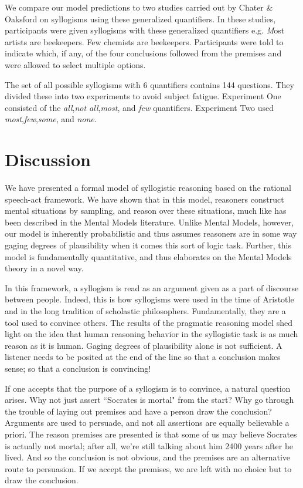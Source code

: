 \documentclass[10pt,letterpaper]{article}
\begin{document}
We compare our model predictions to two studies carried out by Chater \& Oaksford on syllogisms using these generalized quantifiers. In these studies, participants were given syllogisms with these generalized quantifiers e.g. {\emph Most artists are beekeepers. Few chemists are beekeepers.} Participants were told to indicate which, if any, of the four conclusions followed from the premises and were allowed to select multiple options.

The set of all possible syllogisms with 6 quantifiers contains 144 questions.  They divided these into two experiments to avoid subject fatigue. Experiment One consisted of the \emph{all},\emph{not all},\emph{most}, and \emph{few} quantifiers. Experiment Two used \emph{most},\emph{few},\emph{some}, and \emph{none}.

\section{Discussion}

We have presented a formal model of syllogistic reasoning based on the rational speech-act framework. We have shown that in this model, reasoners construct mental situations by sampling, and reason over these situations, much like has been described in the Mental Models literature. Unlike Mental Models, however, our model is inherently probabilistic and thus assumes reasoners are in some way gaging degrees of plausibility when it comes this sort of logic task. Further, this model is fundamentally quantitative, and thus elaborates on the Mental Models theory in a novel way.

In this framework, a syllogism is read as an argument given as a part of discourse between people. Indeed, this is how syllogisms were used in the time of Aristotle and in the long tradition of scholastic philosophers. Fundamentally, they are a tool used to convince others. The results of the pragmatic reasoning model shed light on the idea that human reasoning behavior in the syllogistic task is as much reason as it is human. Gaging degrees of plausibility alone is not sufficient. A listener needs to be posited at the end of the line so that a conclusion makes sense; so that a conclusion is convincing!

If one accepts that the purpose of a syllogism is to convince, a natural question arises. Why not just assert ``Socrates is mortal" from the start? Why go through the trouble of laying out premises and have a person draw the conclusion? Arguments are used to persuade, and not all assertions are equally believable a priori. The reason premises are presented is that some of us may believe Socrates is actually not mortal; after all, we're still talking about him 2400 years after he lived. And so the conclusion is not obvious, and the premises are an alternative route to persuasion. If we accept the premises, we are left with no choice but to draw the conclusion.
\end{document}

